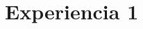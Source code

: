 \documentclass[10pt, twoside]{article}
\begin{document}
\maketitle
\thispagestyle{fancy}

\section*{Experiencia 1}%
\label{sec:Experiencia_1}
\end{document}
